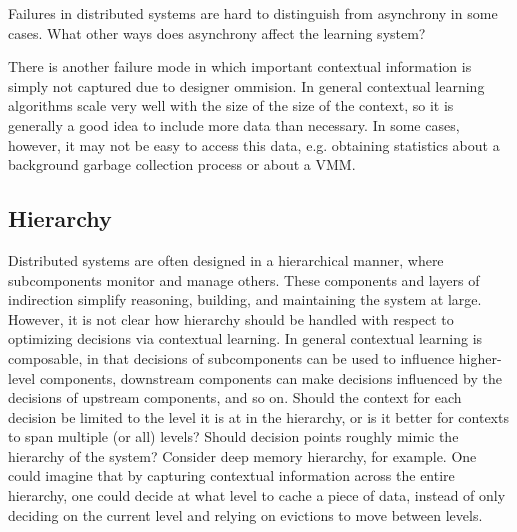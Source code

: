 \documentclass[a4paper,twocolumn]{article}
\newcommand{\ignore}[1]{}
\begin{document}
Failures in distributed systems are hard to distinguish from asynchrony in some
cases. What other ways does asynchrony affect the learning system?

There is another failure mode in which important contextual information is
simply not captured due to designer ommision. In general contextual learning
algorithms scale very well with the size of the size of the context, so it is
generally a good idea to include more data than necessary. In some cases,
however, it may not be easy to access this data, e.g. obtaining statistics
about a background garbage collection process or about a VMM.

\subsection*{Hierarchy}

Distributed systems are often designed in a hierarchical manner, where
subcomponents monitor and manage others. These components and layers of
indirection simplify reasoning, building, and maintaining the system at
large. However, it is not clear how hierarchy should be handled with respect to
optimizing decisions via contextual learning. In general contextual learning is
composable, in that decisions of subcomponents can be used to influence
higher-level components, downstream components can make decisions influenced by
the decisions of upstream components, and so on.  Should the context for each
decision be limited to the level it is at in the hierarchy, or is it better for
contexts to span multiple (or all) levels? Should decision points roughly mimic
the hierarchy of the system? Consider deep memory hierarchy, for example. One
could imagine that by capturing contextual information across the entire
hierarchy, one could decide at what level to cache a piece of data, instead of
only deciding on the current level and relying on evictions to move between
levels.

\ignore{
\begin{itemize}
  \item Will hierarchy aid the learning system via parallelism? Or will it hinder
    it since not all features are visible at every level?
  \item Should learning happen in each component of the system? Or should it be
    centralized?
  \item If learning is happening at multiple levels of the hierarchy, will that
    create interference between the learners? Or will they complement each
    other?
\end{itemize}
}
\end{document}
